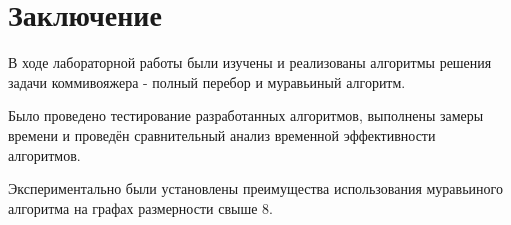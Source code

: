 \chapter*{Заключение}

В ходе лабораторной работы были изучены и реализованы алгоритмы решения задачи коммивояжера - полный перебор и муравьиный алгоритм.

Было проведено тестирование разработанных алгоритмов, выполнены замеры времени и проведён сравнительный анализ временной эффективности алгоритмов.

Экспериментально были установлены преимущества использования муравьиного алгоритма на графах размерности свыше 8.
